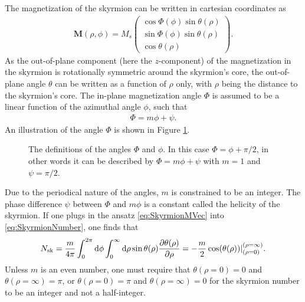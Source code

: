 The magnetization of the skyrmion can be written in cartesian coordinates as
\begin{align}
\label{eq:SkyrmionMVec}
\mathbold{M}(\rho, \phi) = M_s
\begin{pmatrix}
\cos\Phi(\phi)\sin\theta(\rho) \\ \sin\Phi(\phi)\sin\theta(\rho) \\ \cos\theta(\rho)
\end{pmatrix}.
\end{align}
As the out-of-plane component (here the $z$-component) of the magnetization in the skyrmion is rotationally symmetric around the skyrmion's core, the out-of-plane angle $\theta$ can be written as a function of $\rho$ only, with $\rho$ being the distance to the skyrmion's core. The in-plane magnetization angle $\Phi$ is assumed to be a linear function of the azimuthal angle $\phi$, such that
\begin{align}
\Phi = m\phi + \psi.
\end{align}
An illustration of the angle $\Phi$ is shown in Figure \ref{fig:PhiFig}.
\begin{figure}[h!]
\centering
  \centering
\caption{The definitions of the angles $\Phi$ and $\phi$. In this case $\Phi = \phi+\pi/2$, in other words it can be described by $\Phi =m\phi+\psi$ with $m=1$ and $\psi=\pi/2$.}
\label{fig:PhiFig}
\end{figure}
Due to the periodical nature of the angles, $m$ is constrained to be an integer. The phase difference $\psi$ between $\Phi$ and $m\phi$ is a constant called the helicity of the skyrmion. If one plugs in the ansatz \eqref{eq:SkyrmionMVec} into \eqref{eq:SkyrmionNumber}, one finds that
\begin{align}
N_{\textrm{sk}} = \frac{m}{4\pi}\int_0^{2\pi}\operatorname{d}\!{\phi} \int_0^{\infty}\operatorname{d}\!{\rho} \sin\theta(\rho) \frac{\partial\theta(\rho)}{\partial\rho} = - \frac{m}{2} \cos(\theta(\rho))|_{(\rho = 0)}^{(\rho=\infty)}.
\end{align}
Unless $m$ is an even number, one must require that $\theta(\rho = 0) = 0$ and $\theta(\rho = \infty) = \pi$, or $\theta(\rho = 0) = \pi$ and $\theta(\rho = \infty) = 0$ for the skyrmion number to be an integer and not a half-integer.


